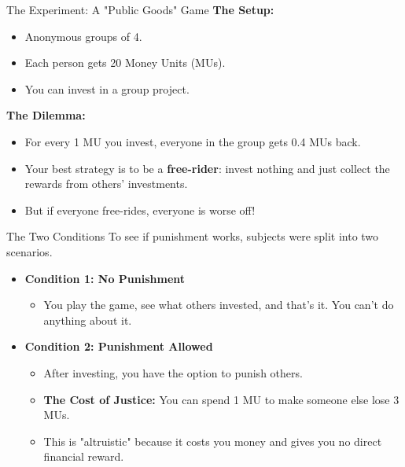 \documentclass{beamer}
\begin{document}
\begin{frame}{The Experiment: A "Public Goods" Game}
    \textbf{The Setup:}
    \begin{itemize}
        \item Anonymous groups of 4.
        \item Each person gets 20 Money Units (MUs).
        \item You can invest in a group project.
    \end{itemize}
    \pause
    \textbf{The Dilemma:}
    \begin{itemize}
        \item For every 1 MU you invest, everyone in the group gets 0.4 MUs back.
        \item Your best strategy is to be a \textbf{free-rider}: invest nothing and just collect the rewards from others' investments.
        \item But if everyone free-rides, everyone is worse off!
    \end{itemize}
\end{frame}

\begin{frame}{The Two Conditions}
    To see if punishment works, subjects were split into two scenarios.
    \begin{itemize}
        \item<1-> \textbf{Condition 1: No Punishment}
        \begin{itemize}
            \item You play the game, see what others invested, and that's it. You can't do anything about it.
        \end{itemize}
        \pause
        \item<2-> \textbf{Condition 2: Punishment Allowed}
        \begin{itemize}
            \item After investing, you have the option to punish others.
            \item \textbf{The Cost of Justice:} You can spend 1 MU to make someone else lose 3 MUs.
            \item This is "altruistic" because it costs you money and gives you no direct financial reward.
        \end{itemize}
    \end{itemize}
\end{frame}
\end{document}
